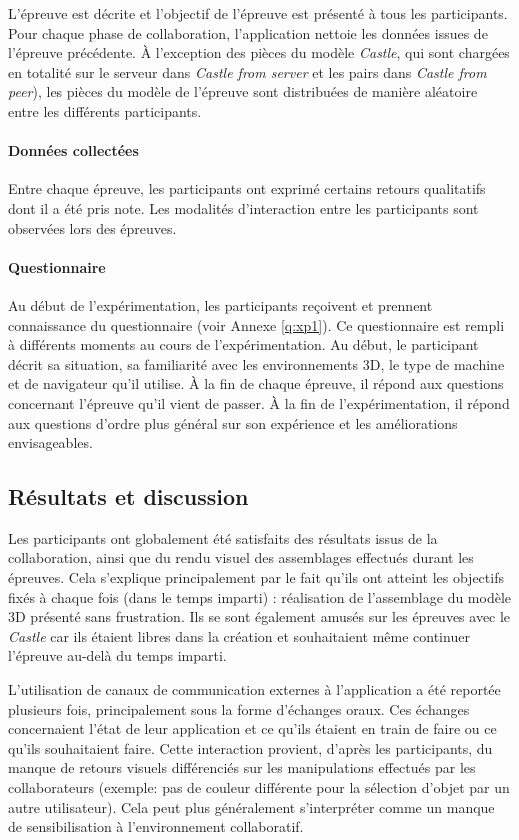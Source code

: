 L'épreuve est décrite et l'objectif de l'épreuve est présenté à tous les participants.
Pour chaque phase de collaboration, l'application nettoie les données issues de 
l'épreuve précédente. 
À l'exception des pièces du modèle \textit{Castle}, qui sont chargées
en totalité sur le serveur dans \textit{Castle from server} et les pairs dans 
\textit{Castle from peer}), les pièces du modèle de l'épreuve 
sont distribuées de manière aléatoire entre les différents participants.

\paragraph{Données collectées}
Entre chaque épreuve, les 
participants ont exprimé certains retours qualitatifs dont il a été pris note. Les modalités d'interaction entre les participants sont observées lors des épreuves.

\paragraph{Questionnaire}
Au début de l'expérimentation, les participants reçoivent et prennent connaissance 
du questionnaire (voir Annexe \ref{q:xp1}). Ce questionnaire est rempli à différents 
moments au cours de l'expérimentation. Au début, le participant décrit sa situation, 
sa familiarité avec les environnements \gls{3D}, le type de machine et de 
navigateur qu'il utilise. À la fin de chaque épreuve, il répond aux questions concernant 
l'épreuve qu'il vient de passer. À la fin de l'expérimentation, il répond aux 
questions d'ordre plus général sur son expérience et les améliorations 
envisageables.
\subsection{Résultats et discussion}
Les participants ont globalement été satisfaits des résultats issus de la 
collaboration, ainsi que du rendu visuel des assemblages effectués durant les 
épreuves. Cela s'explique principalement par le fait qu'ils ont atteint les 
objectifs fixés à chaque fois (dans le temps imparti) : réalisation de l'assemblage du modèle \gls{3D} 
présenté sans frustration. Ils se sont également \og amusés\fg{} sur les épreuves
avec le \textit{Castle} car ils étaient libres dans la création et souhaitaient même continuer l'épreuve au-delà du temps imparti. 

L'utilisation de canaux de communication 
externes à l'application a été reportée plusieurs fois, principalement sous la forme 
d'échanges oraux. Ces échanges concernaient l'état de leur application et ce qu'ils 
étaient en train de faire ou ce qu'ils souhaitaient faire. Cette interaction provient, 
d'après les participants, du manque de retours visuels différenciés sur les 
manipulations effectués par les collaborateurs (exemple: pas de couleur différente 
pour la sélection d'objet par un autre utilisateur). Cela peut plus généralement 
s'interpréter comme un manque de sensibilisation à l'environnement collaboratif. 



